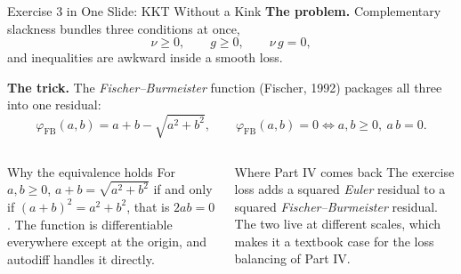 \documentclass[aspectratio=169,11pt]{beamer}
\newcommand{\emphc}[1]{\textcolor{harvardcrimson}{#1}}
\begin{document}
\begin{frame}{Exercise 3 in One Slide: KKT Without a Kink}
\textbf{The problem.} Complementary slackness bundles three conditions at once,
\[
\nu \ge 0, \qquad g \ge 0, \qquad \nu\,g = 0,
\]
and inequalities are awkward inside a smooth loss.

\vspace{0.4em}
\textbf{The trick.} The \emph{Fischer--Burmeister} function (Fischer, 1992) packages all three into one residual:
\[
\varphi_{\mathrm{FB}}(a,b) = a + b - \sqrt{a^2 + b^2},
\qquad
\varphi_{\mathrm{FB}}(a,b) = 0 \iff a, b \ge 0,\ a\,b = 0 .
\]

\begin{columns}[T]
\begin{block}{Why the equivalence holds}
\footnotesize
For $a, b \ge 0$, $a+b=\sqrt{a^2+b^2}$ if and only if $(a+b)^2 = a^2+b^2$, that is $2ab = 0$. The function is differentiable everywhere except at the origin, and autodiff handles it directly.
\end{block}

\begin{exampleblock}{Where Part IV comes back}
\footnotesize
The exercise loss adds a squared \emph{Euler} residual to a squared \emph{Fischer--Burmeister} residual. The two live at different scales, which makes it a textbook case for the \emphc{loss balancing} of Part IV.
\end{exampleblock}
\end{columns}
\end{frame}
\end{document}
